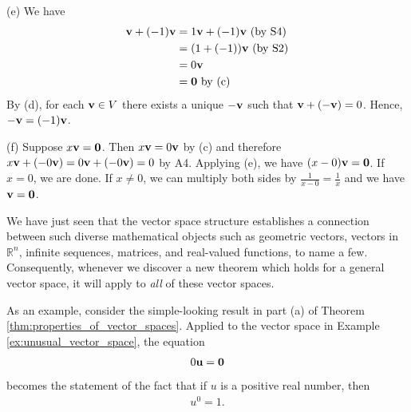 \documentclass[12pt,letterpaper,reqno]{article}
\numberwithin{equation}{section}
\begin{document}
\begin{pf}
(e) We have
	\begin{align*}
		{\bf v}+(-1){\bf v} &=1{\bf v}+(-1){\bf v} \text{ (by S4)}\\
		&=(1+(-1)){\bf v} \text{ (by S2)}\\
		&=0{\bf v} \\
		&={\bf 0} \text{ by (c)}
	\end{align*}
By (d), for each ${\bf v} \in V$ there exists a unique $-{\bf v}$ such that ${\bf v}+(-{\bf v})=0$. Hence, $-{\bf v}=(-1){\bf v}$.

(f) Suppose $x{\bf v}={\bf 0}$. Then $x{\bf v}=0{\bf v}$ by (c) and therefore $x{\bf v}+(-0{\bf v})=0{\bf v}+(-0{\bf v})=0$ by A4. Applying (e), we have $(x-0){\bf v}={\bf 0}$. If $x=0$, we are done. If $x \neq 0$, we can multiply both sides by $\frac{1}{x-0}=\frac{1}{x}$ and we have ${\bf v}={\bf 0}$.
\end{pf}

We have just seen that the vector space structure establishes a connection between such diverse mathematical objects such as geometric vectors, vectors in $\mathbb{R}^n$, infinite sequences, matrices, and real-valued functions, to name a few. Consequently, whenever we discover a new theorem which holds for a general vector space, it will apply to \emph{all} of these vector spaces.

As an example, consider the simple-looking result in part (a) of Theorem \ref{thm:properties_of_vector_spaces}. Applied to the vector space in Example \ref{ex:unusual_vector_space}, the equation
\begin{align*}
	0{\bf u}={\bf 0}
\end{align*}
becomes the statement of the fact that if $u$ is a positive real number, then
\begin{align*}
	u^0=1.
\end{align*}
\end{document}
